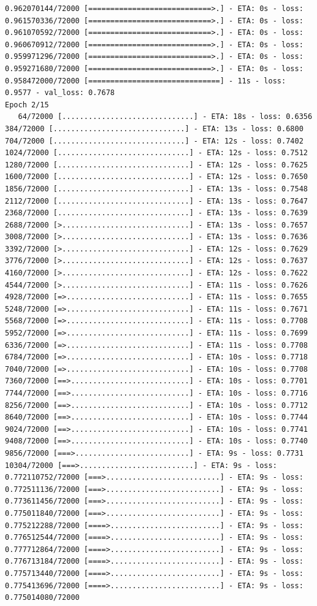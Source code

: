 \documentclass[12pt,fleqn]{article}\usepackage{../../common}
\begin{document}
\begin{verbatim}
0.962070144/72000 [============================>.] - ETA: 0s - loss: 0.961570336/72000 [============================>.] - ETA: 0s - loss: 0.961070592/72000 [============================>.] - ETA: 0s - loss: 0.960670912/72000 [============================>.] - ETA: 0s - loss: 0.959971296/72000 [============================>.] - ETA: 0s - loss: 0.959271680/72000 [============================>.] - ETA: 0s - loss: 0.958472000/72000 [==============================] - 11s - loss: 0.9577 - val_loss: 0.7678
Epoch 2/15
   64/72000 [..............................] - ETA: 18s - loss: 0.6356  384/72000 [..............................] - ETA: 13s - loss: 0.6800  704/72000 [..............................] - ETA: 12s - loss: 0.7402 1024/72000 [..............................] - ETA: 12s - loss: 0.7512 1280/72000 [..............................] - ETA: 12s - loss: 0.7625 1600/72000 [..............................] - ETA: 12s - loss: 0.7650 1856/72000 [..............................] - ETA: 13s - loss: 0.7548 2112/72000 [..............................] - ETA: 13s - loss: 0.7647 2368/72000 [..............................] - ETA: 13s - loss: 0.7639 2688/72000 [>.............................] - ETA: 13s - loss: 0.7657 3008/72000 [>.............................] - ETA: 13s - loss: 0.7636 3392/72000 [>.............................] - ETA: 12s - loss: 0.7629 3776/72000 [>.............................] - ETA: 12s - loss: 0.7637 4160/72000 [>.............................] - ETA: 12s - loss: 0.7622 4544/72000 [>.............................] - ETA: 11s - loss: 0.7626 4928/72000 [=>............................] - ETA: 11s - loss: 0.7655 5248/72000 [=>............................] - ETA: 11s - loss: 0.7671 5568/72000 [=>............................] - ETA: 11s - loss: 0.7708 5952/72000 [=>............................] - ETA: 11s - loss: 0.7699 6336/72000 [=>............................] - ETA: 11s - loss: 0.7708 6784/72000 [=>............................] - ETA: 10s - loss: 0.7718 7040/72000 [=>............................] - ETA: 10s - loss: 0.7708 7360/72000 [==>...........................] - ETA: 10s - loss: 0.7701 7744/72000 [==>...........................] - ETA: 10s - loss: 0.7716 8256/72000 [==>...........................] - ETA: 10s - loss: 0.7712 8640/72000 [==>...........................] - ETA: 10s - loss: 0.7744 9024/72000 [==>...........................] - ETA: 10s - loss: 0.7741 9408/72000 [==>...........................] - ETA: 10s - loss: 0.7740 9856/72000 [===>..........................] - ETA: 9s - loss: 0.7731 10304/72000 [===>..........................] - ETA: 9s - loss: 0.772110752/72000 [===>..........................] - ETA: 9s - loss: 0.772511136/72000 [===>..........................] - ETA: 9s - loss: 0.773611456/72000 [===>..........................] - ETA: 9s - loss: 0.775011840/72000 [===>..........................] - ETA: 9s - loss: 0.775212288/72000 [====>.........................] - ETA: 9s - loss: 0.776512544/72000 [====>.........................] - ETA: 9s - loss: 0.777712864/72000 [====>.........................] - ETA: 9s - loss: 0.776713184/72000 [====>.........................] - ETA: 9s - loss: 0.775713440/72000 [====>.........................] - ETA: 9s - loss: 0.775413696/72000 [====>.........................] - ETA: 9s - loss: 0.775014080/72000 
\end{verbatim}
\end{document}
